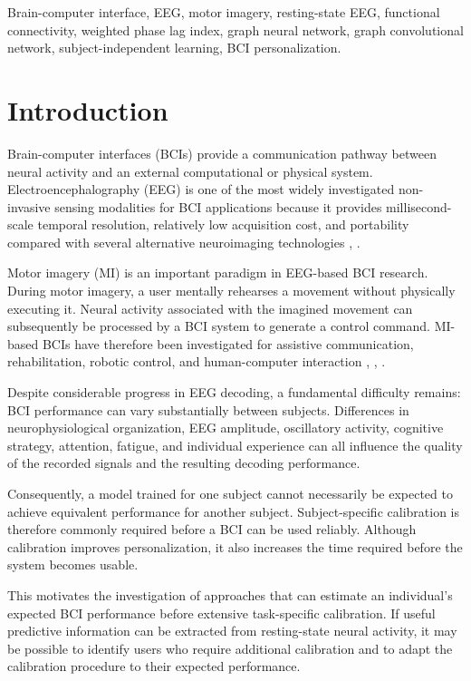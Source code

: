 \documentclass[conference]{IEEEtran}
\begin{document}
\begin{IEEEkeywords}
Brain-computer interface, EEG, motor imagery, resting-state EEG, functional connectivity, weighted phase lag index, graph neural network, graph convolutional network, subject-independent learning, BCI personalization.
\end{IEEEkeywords}

\section{Introduction}
Brain-computer interfaces (BCIs) provide a communication pathway between neural activity and an external computational or physical system. Electroencephalography (EEG) is one of the most widely investigated non-invasive sensing modalities for BCI applications because it provides millisecond-scale temporal resolution, relatively low acquisition cost, and portability compared with several alternative neuroimaging technologies \cite{wolpaw2002}, \cite{lotte2018}.

Motor imagery (MI) is an important paradigm in EEG-based BCI research. During motor imagery, a user mentally rehearses a movement without physically executing it. Neural activity associated with the imagined movement can subsequently be processed by a BCI system to generate a control command. MI-based BCIs have therefore been investigated for assistive communication, rehabilitation, robotic control, and human-computer interaction \cite{blankertz2008}, \cite{ramoser2000}, \cite{schirrmeister2017}.

Despite considerable progress in EEG decoding, a fundamental difficulty remains: BCI performance can vary substantially between subjects. Differences in neurophysiological organization, EEG amplitude, oscillatory activity, cognitive strategy, attention, fatigue, and individual experience can all influence the quality of the recorded signals and the resulting decoding performance.

Consequently, a model trained for one subject cannot necessarily be expected to achieve equivalent performance for another subject. Subject-specific calibration is therefore commonly required before a BCI can be used reliably. Although calibration improves personalization, it also increases the time required before the system becomes usable.

This motivates the investigation of approaches that can estimate an individual’s expected BCI performance before extensive task-specific calibration. If useful predictive information can be extracted from resting-state neural activity, it may be possible to identify users who require additional calibration and to adapt the calibration procedure to their expected performance.
\end{document}
